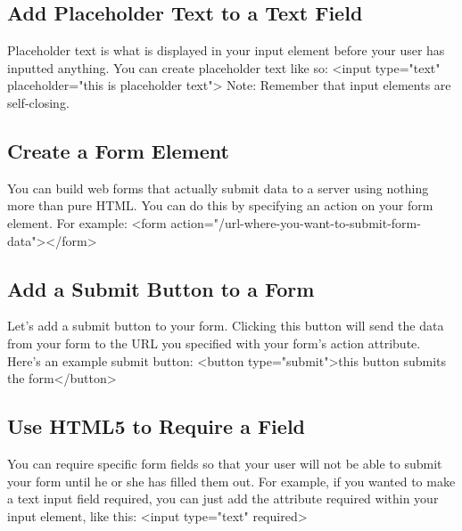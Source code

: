 \documentclass{article}%
\begin{document}
%
\subsection{Add Placeholder Text to a Text Field}%
\label{subsec:AddPlaceholderTexttoaTextField}%
Placeholder text is what is displayed in your input element before your user has inputted anything.\newline%
You can create placeholder text like so:\newline%
<input type="text" placeholder="this is placeholder text">\newline%
Note: Remember that input elements are self{-}closing.\newline%

%
\subsection{Create a Form Element}%
\label{subsec:CreateaFormElement}%
You can build web forms that actually submit data to a server using nothing more than pure HTML. You can do this by specifying an action on your form element.\newline%
For example:\newline%
<form action="/url{-}where{-}you{-}want{-}to{-}submit{-}form{-}data"></form>\newline%

%
\subsection{Add a Submit Button to a Form}%
\label{subsec:AddaSubmitButtontoaForm}%
Let's add a submit button to your form. Clicking this button will send the data from your form to the URL you specified with your form's action attribute.\newline%
Here's an example submit button:\newline%
<button type="submit">this button submits the form</button>\newline%

%
\subsection{Use HTML5 to Require a Field}%
\label{subsec:UseHTML5toRequireaField}%
You can require specific form fields so that your user will not be able to submit your form until he or she has filled them out.\newline%
For example, if you wanted to make a text input field required, you can just add the attribute required within your input element, like this: <input type="text" required>\newline%
\end{document}

